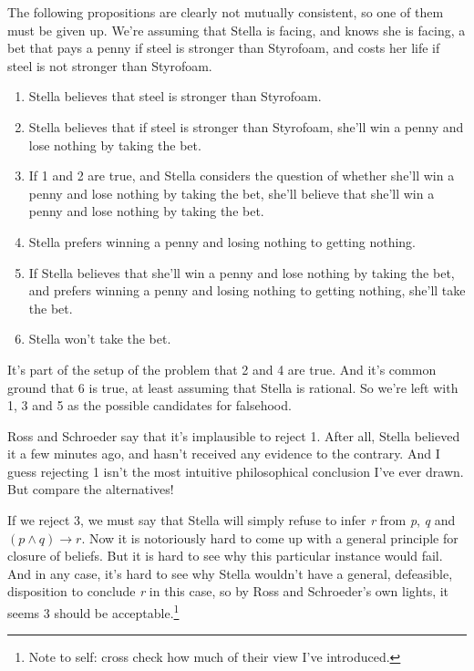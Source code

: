 \documentclass[11pt,]{book}
\providecommand{\tightlist}{%
  \setlength{\itemsep}{0pt}\setlength{\parskip}{0pt}}
\let\rmarkdownfootnote\footnote%
\def\footnote{\protect\rmarkdownfootnote}
\begin{document}
The following propositions are clearly not mutually consistent, so one of them must be given up. We're assuming that Stella is facing, and knows she is facing, a bet that pays a penny if steel is stronger than Styrofoam, and costs her life if steel is not stronger than Styrofoam.

\begin{enumerate}
\def\labelenumi{\arabic{enumi}.}
\tightlist
\item
  Stella believes that steel is stronger than Styrofoam.
\item
  Stella believes that if steel is stronger than Styrofoam, she'll win a
  penny and lose nothing by taking the bet.
\item
  If 1 and 2 are true, and Stella considers the question of whether she'll
  win a penny and lose nothing by taking the bet, she'll believe that
  she'll win a penny and lose nothing by taking the bet.
\item
  Stella prefers winning a penny and losing nothing to getting nothing.
\item
  If Stella believes that she'll win a penny and lose nothing by taking
  the bet, and prefers winning a penny and losing nothing to getting
  nothing, she'll take the bet.
\item
  Stella won't take the bet.
\end{enumerate}

It's part of the setup of the problem that 2 and 4 are true. And it's common ground that 6 is true, at least assuming that Stella is rational. So we're left with 1, 3 and 5 as the possible candidates for falsehood.

Ross and Schroeder say that it's implausible to reject 1. After all, Stella believed it a few minutes ago, and hasn't received any evidence to the contrary. And I guess rejecting 1 isn't the most intuitive philosophical conclusion I've ever drawn. But compare the alternatives!

If we reject 3, we must say that Stella will simply refuse to infer \emph{r} from \emph{p}, \emph{q} and \((p \wedge q) \rightarrow r\). Now it is notoriously hard to come up with a general principle for closure of beliefs. But it is hard to see why this particular instance would fail. And in any case, it's hard to see why Stella wouldn't have a general, defeasible, disposition to conclude \emph{r} in this case, so by Ross and Schroeder's own lights, it seems 3 should be acceptable.\footnote{Note to self: cross check how much of their view I've introduced.}
\end{document}
